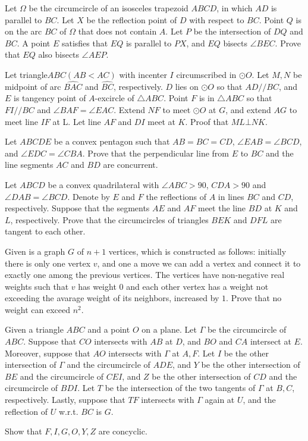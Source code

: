 \documentclass[11pt]{scrartcl}
\begin{document}
\begin{problem}[165465510156789]
	Let $\Omega$ be the circumcircle of an isosceles trapezoid $ABCD$, in which $AD$ is parallel to $BC$. Let $X$ be the reflection point of $D$ with respect to $BC$. Point $Q$ is on the arc $BC$ of $\Omega$ that does not contain $A$. Let $P$ be the intersection of $DQ$ and $BC$. A point $E$ satisfies that $EQ$ is parallel to $PX$, and $EQ$ bisects $\angle BEC$. Prove that $EQ$ also bisects $\angle AEP$.
\end{problem}
\begin{problem}[239934686230450]
Let triangle$ABC(AB<AC)$ with incenter $I$ circumscribed in $\odot O$. Let $M,N$ be midpoint of arc $\widehat{BAC}$ and $\widehat{BC}$, respectively. $D$ lies on $\odot O$ so that $AD//BC$, and $E$ is tangency point of $A$-excircle of $\bigtriangleup ABC$. Point $F$ is in $\bigtriangleup ABC$ so that $FI//BC$ and $\angle BAF=\angle EAC$. Extend $NF$ to meet $\odot O$ at $G$, and extend $AG$ to meet line $IF$ at L. Let line $AF$ and $DI$ meet at $K$. Proof that $ML\bot NK$.
\end{problem}
\begin{problem}[7997372712267182584]
Let $ABCDE$ be a convex pentagon such that $AB=BC=CD$, $\angle{EAB}=\angle{BCD}$, and $\angle{EDC}=\angle{CBA}$. Prove that the perpendicular line from $E$ to $BC$ and the line segments $AC$ and $BD$ are concurrent.
\end{problem}
\begin{problem}[728988632553727]
Let $ABCD$ be a convex quadrilateral with $\angle ABC>90$, $CDA>90$ and $\angle DAB=\angle BCD$. Denote by $E$ and $F$ the reflections of $A$ in lines $BC$ and $CD$, respectively. Suppose that the segments $AE$ and $AF$ meet the line $BD$ at $K$ and $L$, respectively. Prove that the circumcircles of triangles $BEK$ and $DFL$ are tangent to each other.
\end{problem}
\begin{problem}[493735785757154]
	Given is a graph $G$ of $n+1$ vertices, which is constructed as follows: initially there is only one vertex $v$, and one a move we can add a vertex and connect it to exactly one among the previous vertices. The vertices have non-negative real weights such that $v$ has weight $0$ and each other vertex has a weight not exceeding the avarage weight of its neighbors, increased by $1$. Prove that no weight can exceed $n^2$.
\end{problem}
\begin{problem}[2003233604438068678]
Given a triangle $ABC$ and a point $O$ on a plane. Let $\Gamma$ be the circumcircle of $ABC$. Suppose that $CO$ intersects with $AB$ at $D$, and $BO$ and $CA$ intersect at $E$. Moreover, suppose that $AO$ intersects with $\Gamma$ at $A,F$. Let $I$ be the other intersection of $\Gamma$ and the circumcircle of $ADE$, and $Y$ be the other intersection of $BE$ and the circumcircle of $CEI$, and $Z$ be the other intersection of $CD$ and the circumcircle of $BDI$. Let $T$ be the intersection of the two tangents of $\Gamma$ at $B,C$, respectively. Lastly, suppose that $TF$ intersects with $\Gamma$ again at $U$, and the reflection of $U$ w.r.t. $BC$ is $G$.

Show that $F,I,G,O,Y,Z$ are concyclic.
\end{problem}
\end{document}
